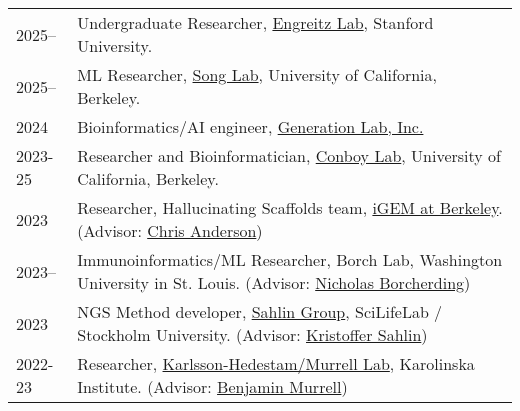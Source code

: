 
\begin{longtable}[l]{@{}p{} p{}}

    2025-- & Undergraduate Researcher, \href{https://www.engreitzlab.org/}{Engreitz Lab}, Stanford University. \\

    2025-- & ML Researcher, \href{https://people.eecs.berkeley.edu/~yss/}{Song Lab}, University of California, Berkeley. \\

    2024 & Bioinformatics/AI engineer, \href{https://www.generationlab.com/}{Generation Lab, Inc.} \\

    2023-25 & Researcher and Bioinformatician, \href{https://conboylab.berkeley.edu/}{Conboy Lab}, University of California, Berkeley. \\

    2023 & Researcher, Hallucinating Scaffolds team, \href{https://igem.studentorg.berkeley.edu/teams/hallucinating-scaffolds/}{iGEM at Berkeley}. (Advisor: \href{https://vcresearch.berkeley.edu/faculty/chris-anderson}{Chris Anderson}) \\

    2023-- & Immunoinformatics/ML Researcher, Borch Lab, Washington University in St. Louis. (Advisor: \href{https://www.borch.dev/}{Nicholas Borcherding}) \\

    2023 & NGS Method developer, \href{https://sahlingroup.github.io/}{Sahlin Group}, SciLifeLab / Stockholm University. (Advisor: \href{https://www.scilifelab.se/researchers/kristoffer-sahlin/}{Kristoffer Sahlin}) \\

    2022-23 & Researcher, \href{https://ki.se/en/people/benjamin-murrell}{Karlsson-Hedestam/Murrell Lab}, Karolinska Institute. (Advisor: \href{https://ki.se/en/people/benjamin-murrell}{Benjamin Murrell})

\end{longtable}
